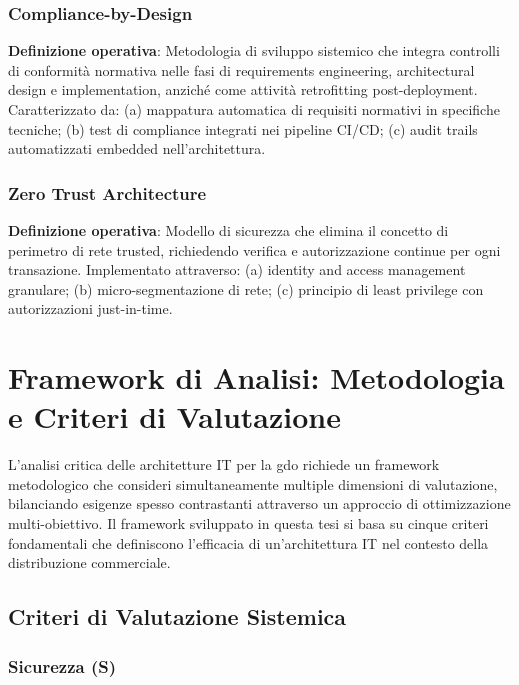 \subsubsection{Compliance-by-Design}

\textbf{Definizione operativa}: Metodologia di sviluppo sistemico che integra controlli di conformità normativa nelle fasi di requirements engineering, architectural design e implementation, anziché come attività retrofitting post-deployment. Caratterizzato da: (a) mappatura automatica di requisiti normativi in specifiche tecniche; (b) test di compliance integrati nei pipeline CI/CD; (c) audit trails automatizzati embedded nell'architettura.

\subsubsection{Zero Trust Architecture}

\textbf{Definizione operativa}: Modello di sicurezza che elimina il concetto di perimetro di rete trusted, richiedendo verifica e autorizzazione continue per ogni transazione. Implementato attraverso: (a) identity and access management granulare; (b) micro-segmentazione di rete; (c) principio di least privilege con autorizzazioni just-in-time.

\section{Framework di Analisi: Metodologia e Criteri di Valutazione}
\label{sec:framework-analisi}

L'analisi critica delle architetture IT per la \gls{gdo} richiede un framework metodologico che consideri simultaneamente multiple dimensioni di valutazione, bilanciando esigenze spesso contrastanti attraverso un approccio di ottimizzazione multi-obiettivo. Il framework sviluppato in questa tesi si basa su cinque criteri fondamentali che definiscono l'efficacia di un'architettura IT nel contesto della distribuzione commerciale.

\subsection{Criteri di Valutazione Sistemica}
\label{subsec:criteri-valutazione}

\subsubsection{Sicurezza (S)}

